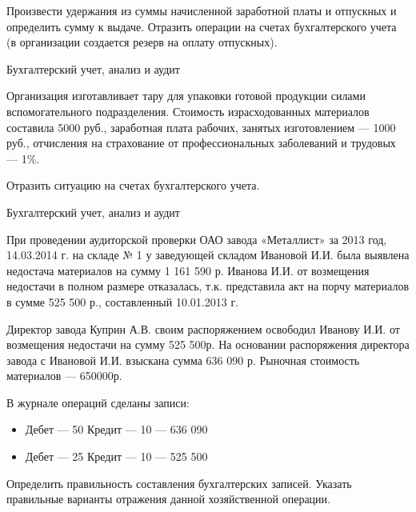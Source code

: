 \documentclass[
	11pt,
	a4paper,
	]
	{article}
\begin{document}
	Произвести удержания из суммы начисленной заработной платы и отпускных и определить сумму к выдаче. Отразить операции на счетах бухгалтерского учета (в организации создается резерв на оплату отпускных).

\begin{center}\lowGE * \end{center}
\newpage



 {Бухгалтерский учет, анализ и аудит}
\prGE

	Организация изготавливает тару для упаковки готовой продукции силами вспомогательного подразделения. Стоимость израсходованных материалов составила 5000 руб., заработная плата рабочих, занятых изготовлением --- 1000 руб., отчисления на страхование от профессиональных заболеваний и трудовых --- 1\%. 
	\medskip

	Отразить ситуацию на счетах бухгалтерского учета.

\begin{center}\lowGE * \end{center}
\newpage





 {Бухгалтерский учет, анализ и аудит}
\prGE

	При проведении аудиторской проверки ОАО завода «Металлист» за 2013 год, 14.03.2014 г. на складе № 1 у заведующей складом Ивановой И.И. была выявлена недостача материалов на сумму 1 161 590 р. Иванова И.И. от возмещения недостачи в полном размере отказалась, т.к. представила акт на порчу материалов в сумме 525 500 р., составленный 10.01.2013 г.
	\medskip

	Директор завода Куприн А.В. своим распоряжением освободил Иванову И.И. от возмещения недостачи на сумму 525 500р. На основании распоряжения директора завода с Ивановой И.И. взыскана сумма 636 090 р. Рыночная стоимость материалов --- 650000р. 
	\medskip

	В журнале операций сделаны записи:

	\begin{itemize}
		\item Дебет --- 50 Кредит --- 10 --- 636 090
		\item Дебет --- 25 Кредит --- 10 --- 525 500
	\end{itemize}

	Определить правильность составления бухгалтерских записей. Указать правильные варианты отражения данной хозяйственной операции.
\end{document}
